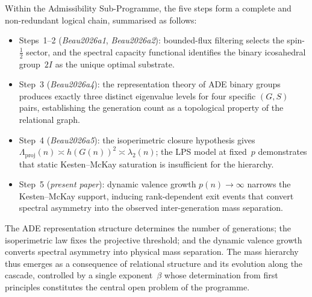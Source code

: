 \documentclass[11pt,a4paper]{article}
\newcommand{\Lproj}{\Lambda_{\mathrm{proj}}}
\newcommand{\ltwo}{\lambda_{2}}
\begin{document}
      Within the Admissibility Sub-Programme, the five steps form a complete
      and non-redundant logical chain, summarised as follows:
      \begin{itemize}[nosep]
  \item Steps~1--2 (\emph{Beau2026a1}, \emph{Beau2026a2}):
  bounded-flux filtering selects the spin-$\tfrac{1}{2}$ sector,
  and the spectral capacity functional identifies the binary
  icosahedral group~$2I$ as the unique optimal substrate.
  \item Step~3 (\emph{Beau2026a4}):
  the representation theory of ADE binary groups produces
  exactly three distinct eigenvalue levels for four specific
  $(G,S)$ pairs, establishing the generation count as a
  topological property of the relational graph.
  \item Step~4 (\emph{Beau2026a5}):
  the isoperimetric closure hypothesis gives
  $\Lproj(n)\asymp h(G(n))^2\asymp\ltwo(n)$;
  the LPS model at fixed~$p$ demonstrates that static
  Kesten--McKay saturation is insufficient for the hierarchy.
  \item Step~5 (\emph{present paper}):
  dynamic valence growth $p(n)\to\infty$ narrows the
  Kesten--McKay support, inducing rank-dependent exit events
  that convert spectral asymmetry into the observed
  inter-generation mass separation.
      \end{itemize}
      The ADE representation structure determines the number of generations;
      the isoperimetric law fixes the projective threshold;
      and the dynamic valence growth converts spectral asymmetry into
      physical mass separation.
      The mass hierarchy thus emerges as a consequence of relational structure
      and its evolution along the cascade, controlled by a single
      exponent~$\beta$ whose determination from first principles
      constitutes the central open problem of the programme.



      
      
\end{document}
